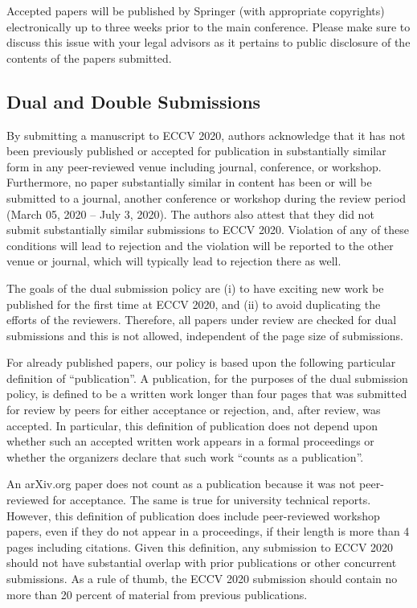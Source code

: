 \documentclass[runningheads]{llncs}
\begin{document}
Accepted papers will be published by Springer (with appropriate copyrights) electronically up to three weeks prior to the main conference. Please make sure to discuss this issue with your legal advisors as it pertains to public disclosure of the contents of the papers submitted.
\subsection{Dual and Double Submissions}
By submitting a manuscript to ECCV 2020, authors acknowledge that it has not been previously published or accepted for publication in substantially similar form in any peer-reviewed venue including journal, conference, or workshop. Furthermore, no paper substantially similar in content has been or will be submitted to a journal, another conference or workshop during the review period (March 05, 2020 – July 3, 2020). The authors also attest that they did not submit substantially similar submissions to ECCV 2020. Violation of any of these conditions will lead to rejection and the violation will be reported to the other venue or journal, which will typically lead to rejection there as well. 

The goals of the dual submission policy are (i) to have exciting new work be published for the first time at ECCV 2020, and (ii) to avoid duplicating the efforts of the reviewers.
Therefore, all papers under review are checked for dual submissions and this is not allowed, independent of the page size of submissions. 

For already published papers, our policy is based upon the following particular definition of ``publication''. A publication, for the purposes of the dual submission policy, is defined to be a written work longer than four pages that was submitted for review by peers for either acceptance or rejection, and, after review, was accepted. In particular, this definition of publication does not depend upon whether such an accepted written work appears in a formal proceedings or whether the organizers declare that such work ``counts as a publication''. 

An arXiv.org paper does not count as a publication because it was not peer-reviewed for acceptance. The same is true for university technical reports. However, this definition of publication does include peer-reviewed workshop papers, even if they do not appear in a proceedings, if their length is more than 4 pages including citations. Given this definition, any submission to ECCV 2020 should not have substantial overlap with prior publications or other concurrent submissions. As a rule of thumb, the ECCV 2020 submission should contain no more than 20 percent of material from previous publications. 
\end{document}

